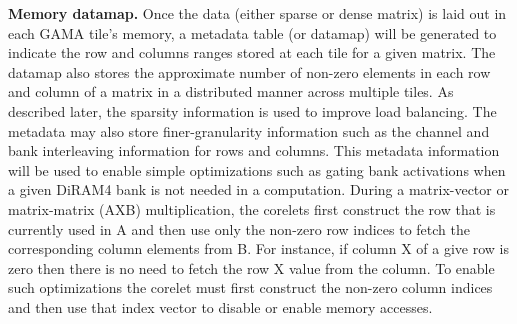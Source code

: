 \vspace{3pt}
\noindent
\textbf{Memory datamap.} 
Once the data (either sparse or dense matrix) is laid out in each GAMA tile's memory, a metadata table (or datamap) will be generated to indicate the row and columns ranges stored at each tile for a given matrix.   
The datamap also stores the  approximate number of non-zero elements in each row and column of a matrix in a distributed manner across multiple tiles. As described later, the sparsity information is used to improve load balancing.     
The metadata may also store finer-granularity information such as the channel and bank interleaving information for rows and columns. 
This metadata information will be used to enable simple optimizations such as gating bank activations when a given DiRAM4 bank is not needed in a computation.    
During a matrix-vector or matrix-matrix (AXB) multiplication, the corelets first construct the row that is currently used in A and then use only the non-zero row indices to fetch the corresponding column elements from B. 
For instance, if column X of a give row is zero then there is no need to fetch the row X value from the column. 
To enable such optimizations the corelet must first construct the non-zero column indices and then use that index vector to disable or enable memory accesses. 




 
